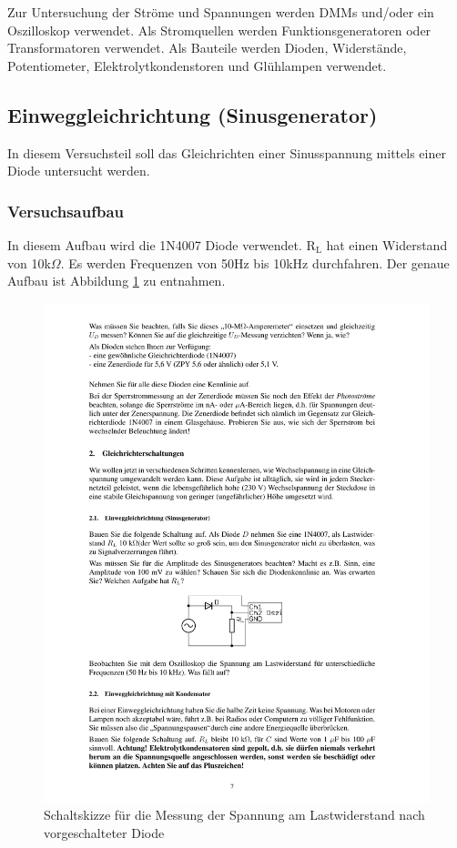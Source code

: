 \documentclass[12pt,a4paper]{article}
\begin{document}
Zur Untersuchung der Ströme und Spannungen werden DMMs und/oder ein Oszilloskop verwendet. Als Stromquellen werden Funktionsgeneratoren oder Transformatoren verwendet. Als Bauteile werden Dioden, Widerstände, Potentiometer, Elektrolytkondenstoren und Glühlampen verwendet.

\subsection{Einweggleichrichtung (Sinusgenerator)}
In diesem Versuchsteil soll das Gleichrichten einer Sinusspannung mittels einer Diode untersucht werden.
\subsubsection{Versuchsaufbau}
In diesem Aufbau wird die 1N4007 Diode verwendet. R$_\text{L}$ hat einen Widerstand von 10k$\Omega$. Es werden Frequenzen von 50Hz bis 10kHz durchfahren. Der genaue Aufbau ist Abbildung \ref{fig:2_1} zu entnahmen.

\begin{figure}[H] 
  \centering
    \includegraphics[trim = 10mm 80mm 10mm 160mm, clip, scale = 1]{ep2_14[Page7].pdf}
  	\caption[Schaltskizze für die Messung der Spannung am Lastwiderstand nach vorgeschalteter Diode]{Schaltskizze für die Messung der Spannung am Lastwiderstand nach vorgeschalteter Diode\footnotemark}
  \label{fig:2_1}
\end{figure}
\end{document}
